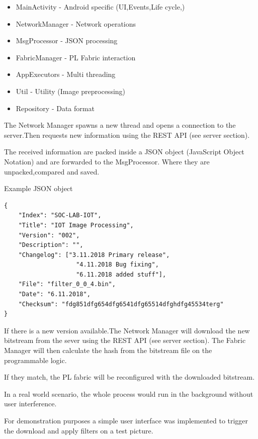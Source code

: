 \begin{itemize}
    \item MainActivity 	    - Android specific (UI,Events,Life cycle,)
    \item NetworkManager	- Network operations 
    \item MsgProcessor	    - JSON processing 
    \item FabricManager	    - PL Fabric interaction
    \item AppExecutors	    - Multi threading
    \item Util			    - Utility (Image preprocessing)
    \item Repository        - Data format
\end{itemize}


The Network Manager spawns a new thread and opens a connection to the server.Then requests new information using the REST API (see server section).

The received information are packed inside a JSON object (JavaScript Object Notation) and are forwarded to the MsgProcessor. Where they are unpacked,compared and saved.

Example JSON object
\begin{verbatim}
{
    "Index": "SOC-LAB-IOT",
    "Title": "IOT Image Processing",
    "Version": "002",
    "Description": "",
    "Changelog": ["3.11.2018 Primary release", 
                    "4.11.2018 Bug fixing", 
                    "6.11.2018 added stuff"],
    "File": "filter_0_0_4.bin",
    "Date": "6.11.2018",
    "Checksum": "fdg851dfg654dfg6541dfg65514dfghdfg45534terg"
}  
\end{verbatim}


If there is a new version available.The Network Manager will download the new bitstream from the sever using the REST API (see server section). The Fabric Manager will then calculate the hash from the bitstream file on the programmable logic.

If they match, the PL fabric will be reconfigured with the downloaded bitstream.

In a real world scenario, the whole process would run in the background without user interference. 

For demonstration purposes a simple user interface was implemented to trigger the download and apply filters on a test picture.

